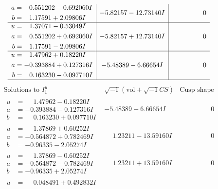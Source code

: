 \documentclass[1p]{elsarticle_modified}
\theoremstyle{definition}
\newcommand{\I}{\sqrt{-1}}
\begin{document}
$$\begin{array}{c|c|c}
\begin{aligned}
a &= \phantom{-}0.551202 - 0.692060 I \\
b &= \phantom{-}1.17591 + 2.09806 I\end{aligned}
 & -5.82157 - 12.73140 I & \phantom{-0.000000 } 0 \\ \hline\begin{aligned}
u &= \phantom{-}1.37071 - 0.53049 I \\
a &= \phantom{-}0.551202 + 0.692060 I \\
b &= \phantom{-}1.17591 - 2.09806 I\end{aligned}
 & -5.82157 + 12.73140 I & \phantom{-0.000000 } 0 \\ \hline\begin{aligned}
u &= \phantom{-}1.47962 + 0.18220 I \\
a &= -0.393884 + 0.127316 I \\
b &= \phantom{-}0.163230 - 0.097710 I\end{aligned}
 & -5.48389 - 6.66654 I & \phantom{-0.000000 } 0\\
 \hline 
 \end{array}$$\newpage$$\begin{array}{c|c|c}  
\text{Solutions to }I^u_{1}& \I (\text{vol} + \sqrt{-1}CS) & \text{Cusp shape}\\
 \hline 
\begin{aligned}
u &= \phantom{-}1.47962 - 0.18220 I \\
a &= -0.393884 - 0.127316 I \\
b &= \phantom{-}0.163230 + 0.097710 I\end{aligned}
 & -5.48389 + 6.66654 I & \phantom{-0.000000 } 0 \\ \hline\begin{aligned}
u &= \phantom{-}1.37869 + 0.60252 I \\
a &= -0.564872 + 0.782469 I \\
b &= -0.96335 - 2.05274 I\end{aligned}
 & \phantom{-}1.23211 - 13.59160 I & \phantom{-0.000000 } 0 \\ \hline\begin{aligned}
u &= \phantom{-}1.37869 - 0.60252 I \\
a &= -0.564872 - 0.782469 I \\
b &= -0.96335 + 2.05274 I\end{aligned}
 & \phantom{-}1.23211 + 13.59160 I & \phantom{-0.000000 } 0 \\ \hline\begin{aligned}
u &= \phantom{-}0.048491 + 0.492832 I \\

\end{aligned}
\end{array}$$
\end{document}
